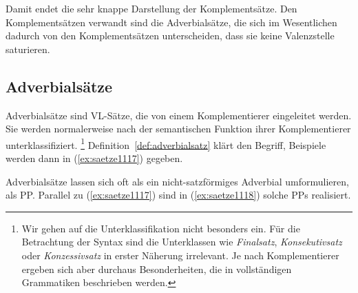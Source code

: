 Damit endet die sehr knappe Darstellung der Komplementsätze.
Den Komplementsätzen verwandt sind die Adverbialsätze, die sich im Wesentlichen dadurch von den Komplementsätzen unterscheiden, dass sie keine Valenzstelle saturieren.

\subsection{Adverbialsätze}

\label{sec:adverbialsaetze}

Adverbialsätze sind VL-Sätze, die von einem Komplementierer eingeleitet werden.
Sie werden normalerweise nach der semantischen Funktion ihrer Komplementierer unterklassifiziert.%
\footnote{Wir gehen auf die Unterklassifikation nicht besonders ein.
Für die Betrachtung der Syntax sind die Unterklassen wie \textit{Finalsatz}, \textit{Konsekutivsatz} oder \textit{Konzessivsatz} in erster Näherung irrelevant.
Je nach Komplementierer ergeben sich aber durchaus Besonderheiten, die in vollständigen Grammatiken beschrieben werden.}
Definition~\ref{def:adverbialsatz} klärt den Begriff, Beispiele werden dann in (\ref{ex:saetze1117}) gegeben.



\begin{exe}
  \ex\label{ex:saetze1117}
  \begin{xlist}
  \end{xlist}
\end{exe}

Adverbialsätze lassen sich oft als ein nicht-satzförmiges Adverbial umformulieren, \zB als PP.
Parallel zu (\ref{ex:saetze1117}) sind in (\ref{ex:saetze1118}) solche PPs realisiert.

\begin{exe}
  \ex\label{ex:saetze1118}
  \begin{xlist}
  \end{xlist}
\end{exe}

